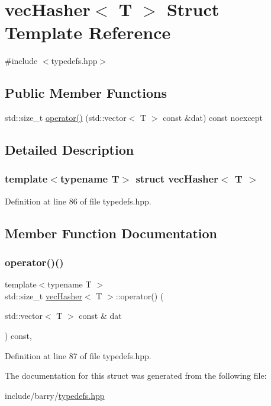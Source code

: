 \hypertarget{structvec_hasher}{}\section{vec\+Hasher$<$ T $>$ Struct Template Reference}
\label{structvec_hasher}


{\ttfamily \#include $<$typedefs.\+hpp$>$}

\subsection*{Public Member Functions}
\begin{DoxyCompactItemize}
\item 
std\+::size\+\_\+t \hyperlink{structvec_hasher_ae8127d9b7d302fe59bd64e7067e7ba61}{operator()} (std\+::vector$<$ T $>$ const \&dat) const noexcept
\end{DoxyCompactItemize}


\subsection{Detailed Description}
\subsubsection*{template$<$typename T$>$\newline
struct vec\+Hasher$<$ T $>$}



Definition at line 86 of file typedefs.\+hpp.



\subsection{Member Function Documentation}
\mbox{\label{structvec_hasher_ae8127d9b7d302fe59bd64e7067e7ba61}} 
\subsubsection{\texorpdfstring{operator()()}{operator()()}}
{\footnotesize\ttfamily template$<$typename T $>$ \\
std\+::size\+\_\+t \hyperlink{structvec_hasher}{vec\+Hasher}$<$ T $>$\+::operator() (\begin{DoxyParamCaption}\item[{std\+::vector$<$ T $>$ const \&}]{dat }\end{DoxyParamCaption}) const\hspace{0.3cm}{\ttfamily [inline]}, {\ttfamily [noexcept]}}



Definition at line 87 of file typedefs.\+hpp.



The documentation for this struct was generated from the following file\+:\begin{DoxyCompactItemize}
\item 
include/barry/\hyperlink{typedefs_8hpp}{typedefs.\+hpp}\end{DoxyCompactItemize}
